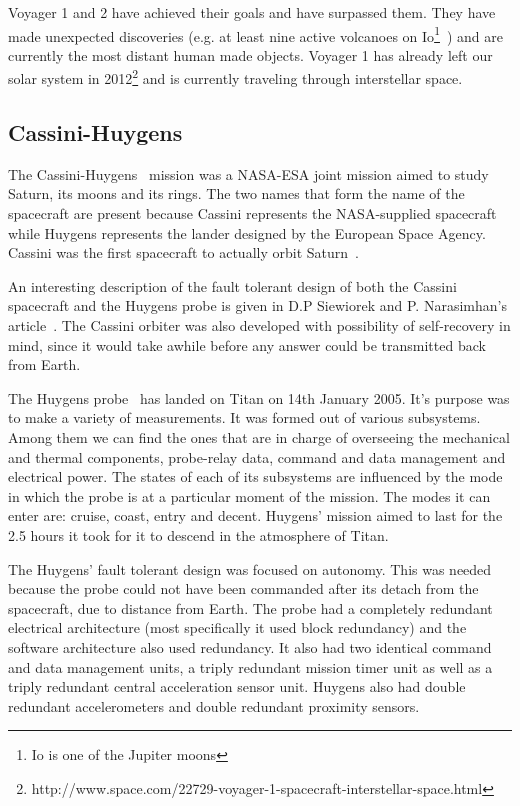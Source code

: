 Voyager 1 and 2 have achieved their goals and have surpassed them. They have
made unexpected discoveries (e.g. at least nine active volcanoes on
Io\footnote{Io is one of the Jupiter moons}~\cite{tvs}) and are currently the
most distant human made objects. Voyager 1 has already left our solar system in
2012\footnote{http://www.space.com/22729-voyager-1-spacecraft-interstellar-space.html}
and is currently traveling through interstellar space.

\subsection{Cassini-Huygens}

The Cassini-Huygens~\cite{ch-nasa} mission was a NASA-ESA joint mission aimed to
study Saturn, its moons and its rings. The two names that form the name of the
spacecraft are present because Cassini represents the NASA-supplied spacecraft
while Huygens represents the lander designed by the European Space Agency.
Cassini was the first spacecraft to actually orbit Saturn~\cite{ch-nasa}.

An interesting description of the fault tolerant design of both the Cassini
spacecraft and the Huygens probe is given in D.P Siewiorek and P.
Narasimhan's article~\cite{ft-space-avionics}. The Cassini orbiter was also
developed with possibility of self-recovery in mind, since it would take awhile
before any answer could be transmitted back from Earth.

The Huygens probe~\cite{hygens} has landed on Titan on 14th January 2005. It's
purpose was to make a variety of measurements. It was formed out of various
subsystems. Among them we can find the ones that are in charge of overseeing the
mechanical and thermal components, probe-relay data, command and data management
and electrical power. The states of each of its subsystems are influenced by the
mode in which the probe is at a particular moment of the mission. The modes it
can enter are: cruise, coast, entry and decent. Huygens' mission aimed to last
for the 2.5 hours it took for it to descend in the atmosphere of Titan.

The Huygens' fault tolerant design was focused on autonomy. This was needed
because the probe could not have been commanded after its detach from the
spacecraft, due to distance from Earth. The probe had a completely redundant
electrical architecture (most specifically it used block redundancy) and the
software architecture also used redundancy. It also had two identical command
and data management units, a triply redundant mission timer unit as well as a
triply redundant central acceleration sensor unit. Huygens also had double
redundant accelerometers and double redundant proximity sensors.

